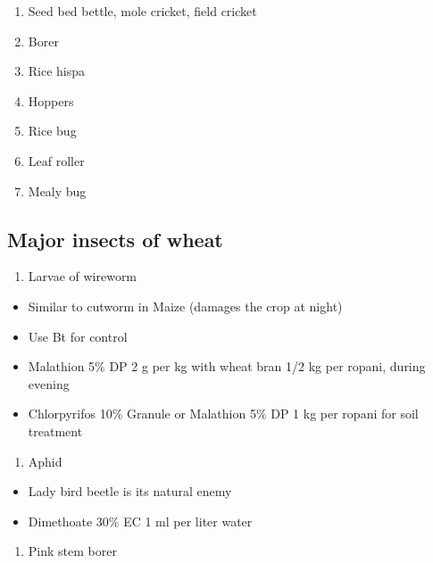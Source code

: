\documentclass[]{book}
\providecommand{\tightlist}{%
  \setlength{\itemsep}{0pt}\setlength{\parskip}{0pt}}
\begin{document}
\begin{enumerate}
\def\labelenumi{\arabic{enumi}.}
\tightlist
\item
  Seed bed bettle, mole cricket, field cricket
\item
  Borer
\item
  Rice hispa
\item
  Hoppers
\item
  Rice bug
\item
  Leaf roller
\item
  Mealy bug
\end{enumerate}

\hypertarget{major-insects-of-wheat}{%
\subsection{Major insects of wheat}\label{major-insects-of-wheat}}

\begin{enumerate}
\def\labelenumi{\arabic{enumi}.}
\tightlist
\item
  Larvae of wireworm
\end{enumerate}

\begin{itemize}
\tightlist
\item
  Similar to cutworm in Maize (damages the crop at night)
\item
  Use Bt for control
\item
  Malathion 5\% DP 2 g per kg with wheat bran 1/2 kg per ropani, during evening
\item
  Chlorpyrifos 10\% Granule or Malathion 5\% DP 1 kg per ropani for soil treatment
\end{itemize}

\begin{enumerate}
\def\labelenumi{\arabic{enumi}.}
\setcounter{enumi}{1}
\tightlist
\item
  Aphid
\end{enumerate}

\begin{itemize}
\tightlist
\item
  Lady bird beetle is its natural enemy
\item
  Dimethoate 30\% EC 1 ml per liter water
\end{itemize}

\begin{enumerate}
\def\labelenumi{\arabic{enumi}.}
\setcounter{enumi}{2}
\tightlist
\item
  Pink stem borer
\end{enumerate}
\end{document}
